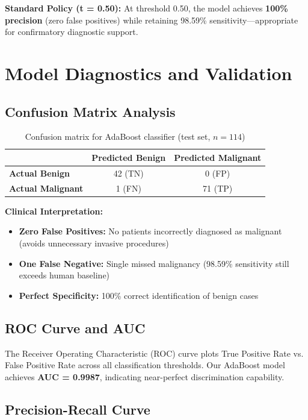 \documentclass[11pt,a4paper]{article}
\begin{document}
\textbf{Standard Policy (t = 0.50):} At threshold 0.50, the model achieves \textbf{100\% precision} (zero false positives) while retaining 98.59\% sensitivity---appropriate for confirmatory diagnostic support.

\section{Model Diagnostics and Validation}

\subsection{Confusion Matrix Analysis}

\begin{table}[H]
\centering
\caption{Confusion matrix for AdaBoost classifier (test set, $n=114$)}
\begin{tabular}{lcc}
\toprule
& \textbf{Predicted Benign} & \textbf{Predicted Malignant} \\
\midrule
\textbf{Actual Benign} & 42 (TN) & 0 (FP) \\
\textbf{Actual Malignant} & 1 (FN) & 71 (TP) \\
\bottomrule
\end{tabular}
\label{tab:confusion-matrix}
\end{table}

\textbf{Clinical Interpretation:}
\begin{itemize}
    \item \textbf{Zero False Positives:} No patients incorrectly diagnosed as malignant (avoids unnecessary invasive procedures)
    \item \textbf{One False Negative:} Single missed malignancy (98.59\% sensitivity still exceeds human baseline)
    \item \textbf{Perfect Specificity:} 100\% correct identification of benign cases
\end{itemize}

\subsection{ROC Curve and AUC}

The Receiver Operating Characteristic (ROC) curve plots True Positive Rate vs. False Positive Rate across all classification thresholds. Our AdaBoost model achieves \textbf{AUC = 0.9987}, indicating near-perfect discrimination capability.

\subsection{Precision-Recall Curve}
\end{document}
